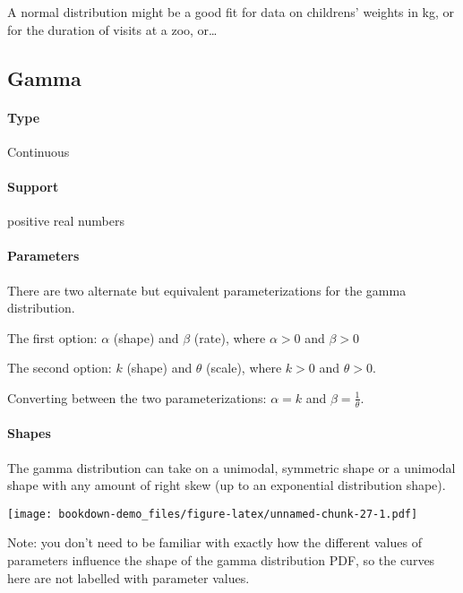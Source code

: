 \documentclass[]{book}
\let\oldparagraph\paragraph
\renewcommand{\paragraph}[1]{\oldparagraph{#1}\mbox{}}
\begin{document}
A normal distribution might be a good fit for data on childrens' weights in kg, or for the duration of visits at a zoo, or\ldots{}

\hypertarget{gamma}{%
\subsection{Gamma}\label{gamma}}

\hypertarget{type-1}{%
\paragraph{Type}\label{type-1}}

Continuous

\hypertarget{support-1}{%
\paragraph{Support}\label{support-1}}

positive real numbers

\hypertarget{parameters-1}{%
\paragraph{Parameters}\label{parameters-1}}

There are two alternate but equivalent parameterizations for the gamma distribution.

The first option: \(\alpha\) (shape) and \(\beta\) (rate), where \(\alpha>0\) and \(\beta>0\)

The second option: \(k\) (shape) and \(\theta\) (scale), where \(k >0\) and \(\theta>0\).

Converting between the two parameterizations: \(\alpha = k\) and \(\beta = \frac{1}{\theta}\).

\hypertarget{shapes-1}{%
\paragraph{Shapes}\label{shapes-1}}

The gamma distribution can take on a unimodal, symmetric shape or a unimodal shape with any amount of right skew (up to an exponential distribution shape).

\texttt{[image: bookdown-demo\_files/figure-latex/unnamed-chunk-27-1.pdf]}

Note: you don't need to be familiar with exactly how the different values of parameters influence the shape of the gamma distribution PDF, so the curves here are not labelled with parameter values.
\end{document}
